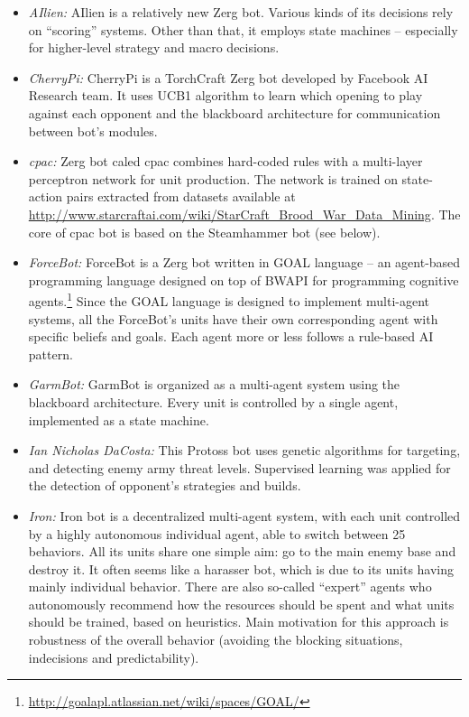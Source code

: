 \begin{itemize}
  \setlength\itemsep{1em}
  
  \item {\em AIlien:} AIlien is a relatively new Zerg bot. Various kinds of its decisions rely on ``scoring'' systems. Other than that, it employs state machines -- especially for higher-level strategy and macro decisions.
  
  \item {\em CherryPi:} CherryPi is a TorchCraft \cite{synnaeve2016torchcraft} Zerg bot developed by Facebook AI Research team. It uses UCB1 algorithm to learn which opening to play against each opponent and the blackboard architecture for communication between bot's modules.
  
  \item {\em cpac:} Zerg bot caled cpac combines hard-coded rules with a multi-layer perceptron network for unit production. The network is trained on state-action pairs extracted from datasets available at \url{http://www.starcraftai.com/wiki/StarCraft_Brood_War_Data_Mining}. The core of cpac bot is based on the Steamhammer bot (see below).
  
  \item {\em ForceBot:} ForceBot is a Zerg bot written in GOAL language -- an agent-based programming language designed on top of BWAPI for programming cognitive agents.\footnote{\url{http://goalapl.atlassian.net/wiki/spaces/GOAL/}} Since the GOAL language is designed to implement multi-agent systems, all the ForceBot's units have their own corresponding agent with specific beliefs and goals. Each agent more or less follows a rule-based AI pattern.  
  
  \item {\em GarmBot:} GarmBot is organized as a multi-agent system using the blackboard architecture. Every unit is controlled by a single agent, implemented as a state machine.
  
  \item {\em Ian Nicholas DaCosta:} This Protoss bot uses genetic algorithms for targeting, and detecting enemy army threat levels. Supervised learning was applied for the detection of opponent's strategies and builds.
  
  \item {\em Iron:} Iron bot is a decentralized multi-agent system, with each unit controlled by a highly autonomous individual agent, able to switch between 25 behaviors. All its units share one simple aim: go to the main enemy base and destroy it. It often seems like a harasser bot, which is due to its units having mainly individual behavior. There are also so-called ``expert'' agents who autonomously recommend how the resources should be spent and what units should be trained, based on heuristics. Main motivation for this approach is robustness of the overall behavior (avoiding the blocking situations, indecisions and predictability).  
  

\end{itemize}
